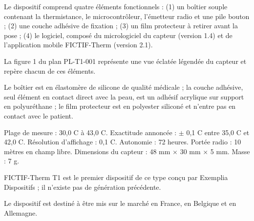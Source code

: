 \documentclass[11pt,a4paper]{article}
\begin{document}
\begin{Form}
\par{}\par

{\small Le dispositif comprend quatre éléments fonctionnels : (1) un boîtier souple contenant la thermistance, le microcontrôleur, l'émetteur radio et une pile bouton ; (2) une couche adhésive de fixation ; (3) un film protecteur à retirer avant la pose ; (4) le logiciel, composé du micrologiciel du capteur (version 1.4) et de l'application mobile FICTIF-Therm (version 2.1).}\par

{\small La figure 1 du plan PL-T1-001 représente une vue éclatée légendée du capteur et repère chacun de ces éléments.}\par

\par{}\par

{\small Le boîtier est en élastomère de silicone de qualité médicale ; la couche adhésive, seul élément en contact direct avec la peau, est un adhésif acrylique sur support en polyuréthane ; le film protecteur est en polyester siliconé et n'entre pas en contact avec le patient.}\par

\par{}\par

{\small Plage de mesure : 30,0 \textdegree{}C à 43,0 \textdegree{}C. Exactitude annoncée : $\pm$ 0,1 \textdegree{}C entre 35,0 \textdegree{}C et 42,0 \textdegree{}C. Résolution d'affichage : 0,1 \textdegree{}C. Autonomie : 72 heures. Portée radio : 10 mètres en champ libre. Dimensions du capteur : 48 mm $\times$ 30 mm $\times$ 5 mm. Masse : 7 g.}\par

\par{}\par

{\small FICTIF-Therm T1 est le premier dispositif de ce type conçu par Exemplia Dispositifs ; il n'existe pas de génération précédente.}\par

\par{}\par

{\small Le dispositif est destiné à être mis sur le marché en France, en Belgique et en Allemagne.}\par


\end{Form}
\end{document}
